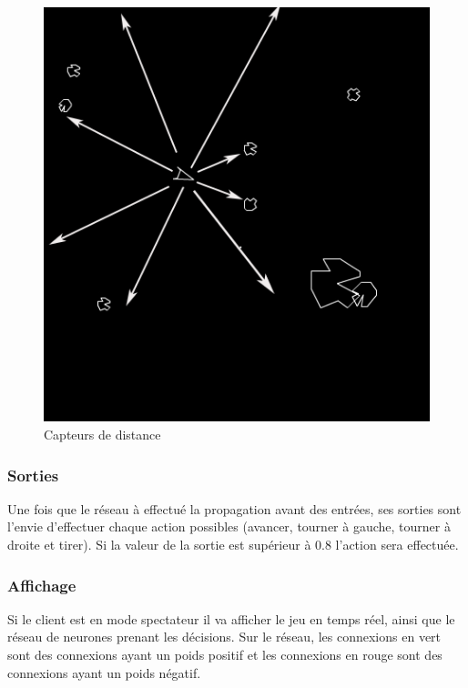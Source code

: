 \documentclass{article}
\begin{document}
\begin{figure}[H]
\begin{center}
	\includegraphics[scale=0.6]{sensors.png}
	\caption{Capteurs de distance}
\end{center}
\end{figure}

\subsubsection{Sorties}

Une fois que le réseau à effectué la propagation avant des entrées, ses sorties sont l'envie d'effectuer chaque action possibles (avancer, tourner à gauche, tourner à droite et tirer). Si la valeur de la sortie est supérieur à 0.8 l'action sera effectuée.

\subsubsection{Affichage}

Si le client est en mode spectateur il va afficher le jeu en temps réel, ainsi que le réseau de neurones prenant les décisions. Sur le réseau, les connexions en vert sont des connexions ayant un poids positif et les connexions en rouge sont des connexions ayant un poids négatif. 
\end{document}
